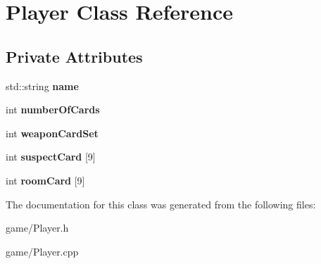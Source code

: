 \hypertarget{classPlayer}{}\section{Player Class Reference}
\label{classPlayer}
\subsection*{Private Attributes}
\begin{DoxyCompactItemize}
\item 
\mbox{\label{classPlayer_af9c920fabaafdeb7961a645315b521ff}} 
std\+::string {\bfseries name}
\item 
\mbox{\label{classPlayer_a331c99cd2b2686a1c45344e57ee8d0b2}} 
int {\bfseries number\+Of\+Cards}
\item 
\mbox{\label{classPlayer_a0d69dcd849a3085041015c0a99389f1a}} 
int {\bfseries weapon\+Card\+Set}
\item 
\mbox{\label{classPlayer_a4006d4bab3208cf3243c8364d48e2667}} 
int {\bfseries suspect\+Card} \mbox{[}9\mbox{]}
\item 
\mbox{\label{classPlayer_af9b61df991a2f7fed88feabad6737d8e}} 
int {\bfseries room\+Card} \mbox{[}9\mbox{]}
\end{DoxyCompactItemize}


The documentation for this class was generated from the following files\+:\begin{DoxyCompactItemize}
\item 
game/Player.\+h\item 
game/Player.\+cpp\end{DoxyCompactItemize}
